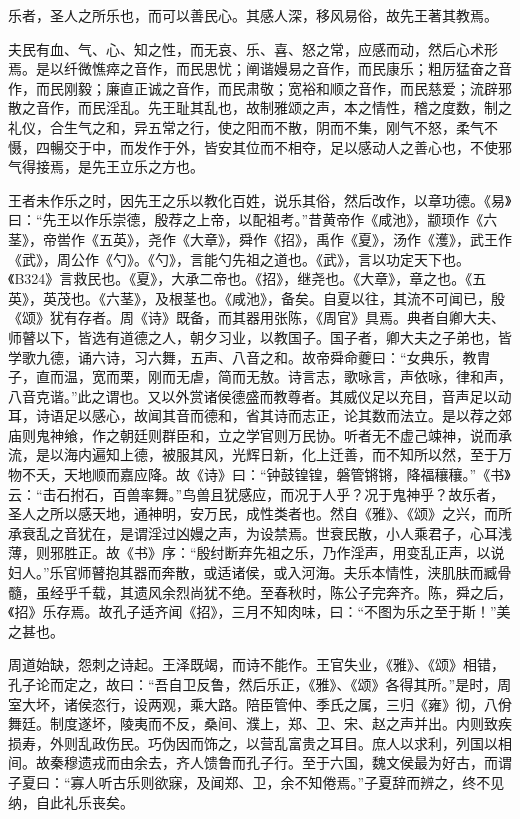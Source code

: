 \documentclass[]{article}
\begin{document}
乐者，圣人之所乐也，而可以善民心。其感人深，移风易俗，故先王著其教焉。

夫民有血、气、心、知之性，而无哀、乐、喜、怒之常，应感而动，然后心术形焉。是以纤微憔瘁之音作，而民思忧；阐谐嫚易之音作，而民康乐；粗厉猛奋之音作，而民刚毅；廉直正诚之音作，而民肃敬；宽裕和顺之音作，而民慈爱；流辟邪散之音作，而民淫乱。先王耻其乱也，故制雅颂之声，本之情性，稽之度数，制之礼仪，合生气之和，异五常之行，使之阳而不散，阴而不集，刚气不怒，柔气不慑，四暢交于中，而发作于外，皆安其位而不相夺，足以感动人之善心也，不使邪气得接焉，是先王立乐之方也。

王者未作乐之时，因先王之乐以教化百姓，说乐其俗，然后改作，以章功德。《易》曰：``先王以作乐崇德，殷荐之上帝，以配祖考。''昔黄帝作《咸池》，颛顼作《六茎》，帝喾作《五英》，尧作《大章》，舜作《招》，禹作《夏》，汤作《濩》，武王作《武》，周公作《勺》。《勺》，言能勺先祖之道也。《武》，言以功定天下也。《B324》言救民也。《夏》，大承二帝也。《招》，继尧也。《大章》，章之也。《五英》，英茂也。《六茎》，及根茎也。《咸池》，备矣。自夏以往，其流不可闻已，殷《颂》犹有存者。周《诗》既备，而其器用张陈，《周官》具焉。典者自卿大夫、师瞽以下，皆选有道德之人，朝夕习业，以教国子。国子者，卿大夫之子弟也，皆学歌九德，诵六诗，习六舞，五声、八音之和。故帝舜命夔曰：``女典乐，教胄子，直而温，宽而栗，刚而无虐，简而无敖。诗言志，歌咏言，声依咏，律和声，八音克谐。''此之谓也。又以外赏诸侯德盛而教尊者。其威仪足以充目，音声足以动耳，诗语足以感心，故闻其音而德和，省其诗而志正，论其数而法立。是以荐之郊庙则鬼神飨，作之朝廷则群臣和，立之学官则万民协。听者无不虚己竦神，说而承流，是以海内遍知上德，被服其风，光辉日新，化上迁善，而不知所以然，至于万物不夭，天地顺而嘉应降。故《诗》曰：``钟鼓锽锽，磐管锵锵，降福穰穰。''《书》云：``击石拊石，百兽率舞。''鸟兽且犹感应，而况于人乎？况于鬼神乎？故乐者，圣人之所以感天地，通神明，安万民，成性类者也。然自《雅》、《颂》之兴，而所承衰乱之音犹在，是谓淫过凶嫚之声，为设禁焉。世衰民散，小人乘君子，心耳浅薄，则邪胜正。故《书》序：``殷纣断弃先祖之乐，乃作淫声，用变乱正声，以说妇人。''乐官师瞽抱其器而奔散，或适诸侯，或入河海。夫乐本情性，浃肌肤而臧骨髓，虽经乎千载，其遗风余烈尚犹不绝。至春秋时，陈公子完奔齐。陈，舜之后，《招》乐存焉。故孔子适齐闻《招》，三月不知肉味，曰：``不图为乐之至于斯！''美之甚也。

周道始缺，怨刺之诗起。王泽既竭，而诗不能作。王官失业，《雅》、《颂》相错，孔子论而定之，故曰：``吾自卫反鲁，然后乐正，《雅》、《颂》各得其所。''是时，周室大坏，诸侯恣行，设两观，乘大路。陪臣管仲、季氏之属，三归《雍》彻，八佾舞廷。制度遂坏，陵夷而不反，桑间、濮上，郑、卫、宋、赵之声并出。内则致疾损寿，外则乱政伤民。巧伪因而饰之，以营乱富贵之耳目。庶人以求利，列国以相间。故秦穆遗戎而由余去，齐人馈鲁而孔子行。至于六国，魏文侯最为好古，而谓子夏曰：``寡人听古乐则欲寐，及闻郑、卫，余不知倦焉。''子夏辞而辨之，终不见纳，自此礼乐丧矣。
\end{document}
